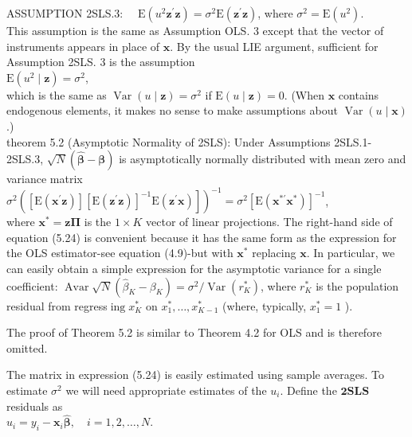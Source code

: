 \documentclass[10pt]{article}
\begin{document}
ASSUMPTION 2SLS.3: $\quad \mathrm{E}\left(u^{2} \mathbf{z}^{\prime} \mathbf{z}\right)=\sigma^{2} \mathrm{E}\left(\mathbf{z}^{\prime} \mathbf{z}\right)$, where $\sigma^{2}=\mathrm{E}\left(u^{2}\right)$.\\
This assumption is the same as Assumption OLS. 3 except that the vector of instruments appears in place of $\mathbf{x}$. By the usual LIE argument, sufficient for Assumption 2SLS. 3 is the assumption\\
$\mathrm{E}\left(u^{2} \mid \mathbf{z}\right)=\sigma^{2}$,\\
which is the same as $\operatorname{Var}(u \mid \mathbf{z})=\sigma^{2}$ if $\mathrm{E}(u \mid \mathbf{z})=0$. (When $\mathbf{x}$ contains endogenous elements, it makes no sense to make assumptions about $\operatorname{Var}(u \mid \mathbf{x})$.)\\
theorem 5.2 (Asymptotic Normality of 2SLS): Under Assumptions 2SLS.1-2SLS.3, $\sqrt{N}(\hat{\boldsymbol{\beta}}-\boldsymbol{\beta})$ is asymptotically normally distributed with mean zero and variance matrix\\
$\left.\sigma^{2}\left(\left[\mathrm{E}\left(\mathbf{x}^{\prime} \mathbf{z}\right)\right]\left[\mathrm{E}\left(\mathbf{z}^{\prime} \mathbf{z}\right)\right]^{-1} \mathrm{E}\left(\mathbf{z}^{\prime} \mathbf{x}\right)\right]\right)^{-1}=\sigma^{2}\left[\mathrm{E}\left(\mathbf{x}^{* \prime} \mathbf{x}^{*}\right)\right]^{-1}$,\\
where $\mathbf{x}^{*}=\mathbf{z} \boldsymbol{\Pi}$ is the $1 \times K$ vector of linear projections. The right-hand side of equation (5.24) is convenient because it has the same form as the expression for the OLS estimator-see equation (4.9)-but with $\mathbf{x}^{*}$ replacing $\mathbf{x}$. In particular, we can easily obtain a simple expression for the asymptotic variance for a single coefficient: $\operatorname{Avar} \sqrt{N}\left(\hat{\beta}_{K}-\beta_{K}\right)=\sigma^{2} / \operatorname{Var}\left(r_{K}^{*}\right)$, where $r_{K}^{*}$ is the population residual from regress$\operatorname{ing} x_{K}^{*}$ on $x_{1}^{*}, \ldots, x_{K-1}^{*}$ (where, typically, $x_{1}^{*}=1$ ).

The proof of Theorem 5.2 is similar to Theorem 4.2 for OLS and is therefore omitted.

The matrix in expression (5.24) is easily estimated using sample averages. To estimate $\sigma^{2}$ we will need appropriate estimates of the $u_{i}$. Define the $\mathbf{2 S L S}$ residuals as\\
$\hat{u}_{i}=y_{i}-\mathbf{x}_{i} \hat{\boldsymbol{\beta}}, \quad i=1,2, \ldots, N$.
\end{document}
